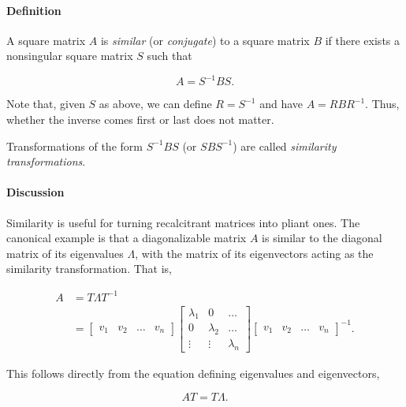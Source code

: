 \documentclass{article}
\begin{document}

\paragraph{Definition}
A square matrix $A$ is \emph{similar} (or \emph{conjugate}) to a square matrix $B$ if there exists a nonsingular square matrix $S$ such that

\begin{equation}
A = S^{-1}BS.
\end{equation}

Note that, given $S$ as above, we can define $R=S^{-1}$ and have $A=RBR^{-1}$.  Thus, whether the inverse comes first or last does not matter.

Transformations of the form $S^{-1}BS$ (or $SBS^{-1}$) are called \emph{similarity transformations}.

\paragraph{Discussion}
Similarity is useful for turning recalcitrant matrices into pliant ones.  The canonical example is that a diagonalizable matrix $A$ is similar to the diagonal matrix of its eigenvalues $\Lambda$, with the matrix of its eigenvectors acting as the similarity transformation.  That is,

\begin{align}
A &= T\Lambda T^{-1} \\
&= \left[ \begin{array}{cccc}
v_1 & v_2 & \ldots & v_n
\end{array} \right]
\left[ \begin{array}{ccc}
\lambda_1 & 0 & \ldots \\
0 & \lambda_2 & \ldots \\
\vdots & \vdots & \lambda_n
\end{array} \right]
\left[
\begin{array}{cccc}
v_1 & v_2 & \ldots & v_n
\end{array} \right]^{-1}.
\end{align}

This follows directly from the equation defining eigenvalues and eigenvectors,

\begin{equation}
AT=T\Lambda.
\end{equation}
\end{document}
